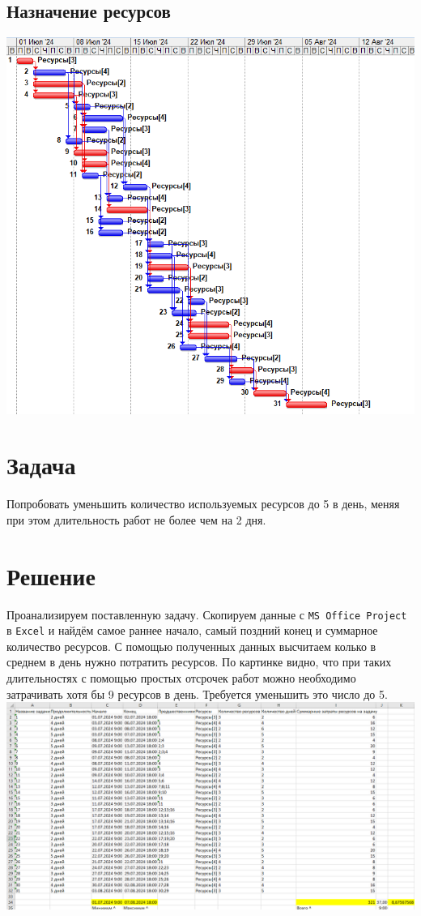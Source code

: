 \documentclass[14pt]{article}
\begin{document}
	\subsection{Назначение ресурсов}
	\includegraphics[width=\textwidth]{../img/init_resource_manage.png}
\section{Задача}
	Попробовать уменьшить количество используемых ресурсов до 5 в день, меняя при этом длительность работ не более чем на 2 дня.
\section{Решение}
	Проанализируем поставленную задачу.
	Скопируем данные с \texttt{MS Office Project} в \texttt{Excel} и найдём самое раннее начало,
		самый поздний конец и суммарное количество ресурсов.
	С помощью полученных данных высчитаем колько в среднем в день нужно потратить ресурсов.
	По картинке видно,
		что при таких длительностях с помощью простых отсрочек работ можно необходимо затрачивать хотя бы 9 ресурсов в день.
	Требуется уменьшить это число до 5.\\
	\includegraphics[width=\textwidth]{../img/init_time_estimation.png}\\
	
\end{document}
